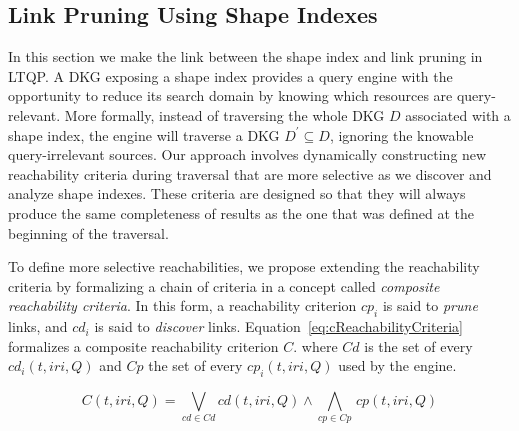 \subsection{Link Pruning Using Shape Indexes}\label{sec:sourceSelection}

In this section we make the link between the shape index and link pruning in LTQP.
A DKG exposing a shape index provides a query engine with the opportunity to reduce its search domain by knowing which resources are query-relevant.
More formally, instead of traversing the whole DKG $D$ associated with a shape index, the engine will traverse a DKG $D^{\prime} \subseteq D$, ignoring the knowable query-irrelevant sources.
Our approach involves dynamically constructing new reachability criteria during traversal that are more selective as we discover and analyze shape indexes.
These criteria are designed so that they will always produce the same completeness of results as the one that was defined at the beginning of the traversal.

To define more selective reachabilities, we propose extending the reachability criteria by formalizing a chain of criteria in a concept called \emph{composite reachability criteria}.
In this form, a reachability criterion $cp_i$ is said to \emph{prune} links, and $cd_i$ is said to \emph{discover} links.
Equation~\ref{eq:cReachabilityCriteria} formalizes a composite reachability criterion $C$.
where $Cd$ is the set of every $cd_i(t, iri, Q)$ and $Cp$ the set of every $cp_i(t, iri, Q)$ used by the engine.

\begin{equation}\label{eq:cReachabilityCriteria}
   C(t, iri, Q) = \bigvee_{cd \in Cd} cd(t, iri, Q) \mathrel{\land} \bigwedge_{cp \in Cp} \, cp(t, iri, Q)
\end{equation}

